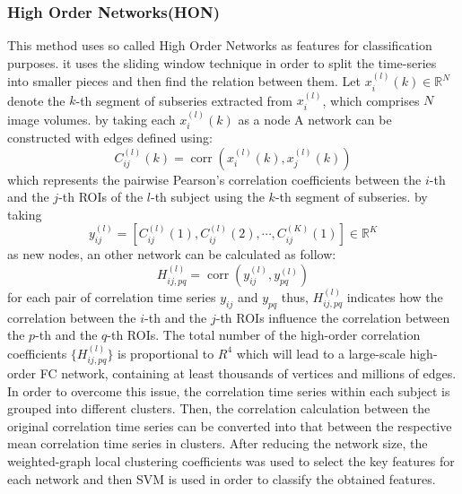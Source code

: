\documentclass[journal]{IEEEtran}
\begin{document}
	\subsubsection{High Order Networks(HON)}
	This method uses so called High Order Networks as features for classification purposes. it uses the sliding window technique in order to split the time-series into smaller pieces and then find the relation between them. Let $x_{i}^{(l)}(k) \in \mathbb{R}^N$ denote the $k$-th segment of subseries extracted from $x_{i}^{(l)}$, which comprises $N$ image volumes. by taking each $x_{i}^{(l)}(k)$ as a node A network can be constructed with edges defined using:
	\[
	C_{ij}^{(l)}(k) = \operatorname{corr}\left(x_{i}^{(l)}(k),x_{j}^{(l)}(k)
	\right)
	\]
	which represents the pairwise Pearson’s correlation coefficients
	between the $i$-th and the $j$-th ROIs of the $l$-th subject using the $k$-th segment of subseries. 
	by taking  
	\[
	y_{ij}^{(l)} = \left[ 
	C_{ij}^{(l)}(1), C_{ij}^{(l)}(2), \cdots , C_{ij}^{(K)}(1) 
	\right] \in \mathbb{R}^K
	\]
	as new nodes, an other network can be calculated as follow: 
	\[
	H_{ij,pq}^{(l)} = \operatorname{corr} \left(
	y_{ij}^{(l)},y_{pq}^{(l)}
	\right)
	\]
	for each pair of correlation time series $y_{ij}$ and $y_{pq}$ thus, $H_{ij,pq}^{(l)}$ indicates how the correlation between the $i$-th and the $j$-th ROIs influence the correlation between the $p$-th and the $q$-th ROIs.
	The total number of the high-order correlation coefficients
	$\{ H_{ij,pq}^{(l)} \}$ is proportional to $R^4$ which will lead to a large-scale high-order FC
	network, containing at least thousands of vertices and millions
	of edges. In order to overcome this issue, the correlation time series within each subject is grouped into different clusters. Then, the correlation calculation
	between the original correlation time series can be
	converted into that between the respective mean correlation
	time series in clusters. After reducing the network size, the
	weighted-graph local clustering coefficients was used to select the key features for each network and then SVM is used in order to classify the obtained features.  
	
\end{document}
